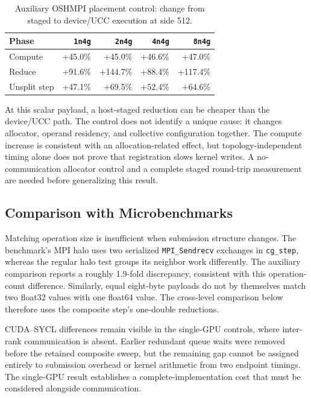 \begin{table}[htbp]
\centering
\caption{Auxiliary OSHMPI placement control: change from staged to device/UCC execution at side 512.}
\label{tab:m-oshmpi-reduce-placement}
\footnotesize
\begin{tabular}{lrrrr}
\toprule
Phase & \texttt{1n4g} & \texttt{2n4g} & \texttt{4n4g} & \texttt{8n4g}\\
\midrule
Compute & +45.0\% & +45.0\% & +46.6\% & +47.0\%\\
Reduce & +91.6\% & +144.7\% & +88.4\% & +117.4\%\\
Unsplit step & +47.1\% & +69.5\% & +52.4\% & +64.6\%\\
\bottomrule
\end{tabular}
\end{table}

At this scalar payload, a host-staged reduction can be cheaper than the device/UCC path. The control does not identify a unique cause: it changes allocator, operand residency, and collective configuration together. The compute increase is consistent with an allocation-related effect, but topology-independent timing alone does not prove that registration slows kernel writes. A no-communication allocator control and a complete staged round-trip measurement are needed before generalizing this result.

\subsection{Comparison with Microbenchmarks}\label{sec:cg-comparison-micro}

Matching operation size is insufficient when submission structure changes. The benchmark's MPI halo uses two serialized \texttt{MPI\_Sendrecv} exchanges in \texttt{cg\_step}, whereas the regular halo test groups its neighbor work differently. The auxiliary comparison reports a roughly 1.9-fold discrepancy, consistent with this operation-count difference. Similarly, equal eight-byte payloads do not by themselves match two float32 values with one float64 value. The cross-level comparison below therefore uses the composite step's one-double reductions.

CUDA--SYCL differences remain visible in the single-GPU controls, where inter-rank communication is absent. Earlier redundant queue waits were removed before the retained composite sweep, but the remaining gap cannot be assigned entirely to submission overhead or kernel arithmetic from two endpoint timings. The single-GPU result establishes a complete-implementation cost that must be considered alongside communication.

